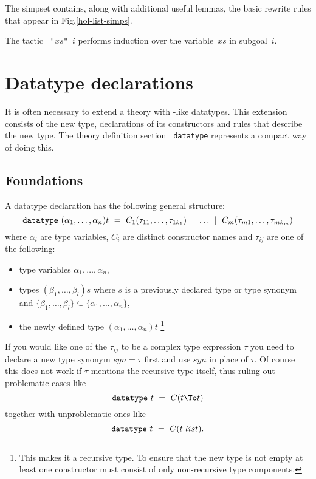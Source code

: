 The simpset  contains, along with additional useful lemmas,
the basic rewrite rules that appear in Fig.\ts\ref{hol-list-simps}.

The tactic {\tt{} "$xs$" $i$} performs induction over the
variable~$xs$ in subgoal~$i$.


\section{Datatype declarations}

\underscoreon

It is often necessary to extend a theory with \ML-like datatypes.  This
extension consists of the new type, declarations of its constructors and
rules that describe the new type. The theory definition section {\tt
  datatype} represents a compact way of doing this.


\subsection{Foundations}

A datatype declaration has the following general structure:
\[ \mbox{\tt datatype}~ (\alpha_1,\dots,\alpha_n)t ~=~
      C_1(\tau_{11},\dots,\tau_{1k_1}) ~\mid~ \dots ~\mid~
      C_m(\tau_{m1},\dots,\tau_{mk_m}) 
\]
where $\alpha_i$ are type variables, $C_i$ are distinct constructor names and
$\tau_{ij}$ are one of the following:
\begin{itemize}
\item type variables $\alpha_1,\dots,\alpha_n$,
\item types $(\beta_1,\dots,\beta_l)s$ where $s$ is a previously declared
  type or type synonym and $\{\beta_1,\dots,\beta_l\} \subseteq
  \{\alpha_1,\dots,\alpha_n\}$,
\item the newly defined type $(\alpha_1,\dots,\alpha_n)t$ \footnote{This
    makes it a recursive type. To ensure that the new type is not empty at
    least one constructor must consist of only non-recursive type
    components.}
\end{itemize}
If you would like one of the $\tau_{ij}$ to be a complex type expression
$\tau$ you need to declare a new type synonym $syn = \tau$ first and use
$syn$ in place of $\tau$. Of course this does not work if $\tau$ mentions the
recursive type itself, thus ruling out problematic cases like \[ \mbox{\tt
  datatype}~ t ~=~ C(t \To t) \] together with unproblematic ones like \[
\mbox{\tt datatype}~ t ~=~ C(t~list). \]

